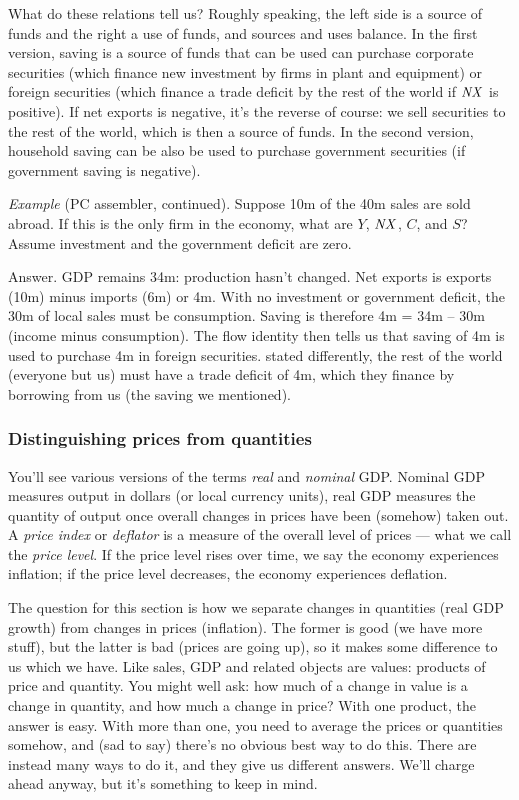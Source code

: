 \documentclass[12pt,letterpaper]{article}
\newcommand{\NX}{\mbox{\em NX\/}}
\begin{document}
What do these relations tell us?
Roughly speaking, the left side is a source of funds and the right a use
of funds, and sources and uses balance.
In the first version, saving is a source of funds that can be used
can purchase corporate securities
(which finance new investment by firms in plant and equipment)
or foreign securities (which finance a trade deficit by the rest of the world
 if $ \mbox{\em NX\/} $ is positive).
If net exports is negative, it's the reverse of course:
we sell securities to the rest of the world, which is then a source of funds.
In the second version,
household saving can be also be used to purchase government securities
(if government saving is negative).

{\it Example\/} (PC assembler, continued).
Suppose 10m of the 40m sales are sold abroad.
If this is the only firm in the economy, what are $Y$, $\NX$, $C$, and $S$?
Assume investment and the government deficit are zero.


Answer.  GDP remains 34m:  production hasn't changed.
Net exports is exports (10m) minus imports (6m) or 4m.
With no investment or government deficit, the 30m of local sales must be consumption.
Saving is therefore 4m = 34m -- 30m (income minus consumption).
The flow identity then tells us that saving of 4m is used to purchase 4m
in foreign securities.
stated differently, the rest of the world (everyone but us) must have a trade deficit
of 4m, which they finance by borrowing from us (the saving we mentioned).


\subsubsection*{Distinguishing prices from quantities}


You'll see various versions of the terms {\it real\/} and {\it nominal\/} GDP.
Nominal GDP measures output in dollars (or local currency units),
real GDP measures the quantity of output once overall changes in prices have been
(somehow) taken out.
A {\it price index\/} or {\it deflator\/} is a measure of the
overall level of prices --- what we call the {\it price level\/}.
If the price level rises over time, we say the economy experiences
inflation; if the price level decreases, the economy experiences
deflation.

The question for this section is how we separate changes in quantities
(real GDP growth) from changes in prices (inflation).
The former is good (we have more stuff), but the latter is bad (prices are going up),
so it makes some difference to us which we have.
Like sales,
GDP and related objects are values: products of price and quantity.
You might well ask:  how much of a change in value is a change
in quantity, and how much a change in price?
With one product, the answer is easy.
With more than one, you need to average the prices or quantities somehow,
and (sad to say) there's no obvious best way to do this.
There are instead many ways to do it, and they give us
different answers.
We'll charge ahead anyway, but it's something to keep in mind.
\end{document}
